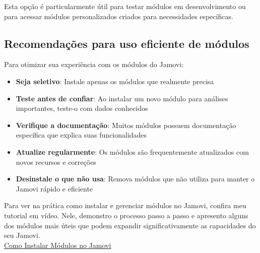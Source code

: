 Esta opção é particularmente útil para testar módulos em desenvolvimento ou para acessar módulos personalizados criados para necessidades específicas.

\subsection{Recomendações para uso eficiente de módulos}

Para otimizar sua experiência com os módulos do Jamovi:

\begin{itemize}
    \item \textbf{Seja seletivo}: Instale apenas os módulos que realmente precisa
    \item \textbf{Teste antes de confiar}: Ao instalar um novo módulo para análises importantes, teste-o com dados conhecidos
    \item \textbf{Verifique a documentação}: Muitos módulos possuem documentação específica que explica suas funcionalidades
    \item \textbf{Atualize regularmente}: Os módulos são frequentemente atualizados com novos recursos e correções
    \item \textbf{Desinstale o que não usa}: Remova módulos que não utiliza para manter o Jamovi rápido e eficiente
\end{itemize}

\begin{tcolorbox}[colback=white,colframe=green,title={\faPlayCircle \ Dica de Conteúdo}]
  Para ver na prática como instalar e gerenciar módulos no Jamovi, confira meu tutorial em vídeo. Nele, demonstro o processo passo a passo e apresento alguns dos módulos mais úteis que podem expandir significativamente as capacidades do seu Jamovi.\\
  \faYoutube{} \href{https://youtu.be/qBeRMNldzgs?si=TRYPqcPQeUFthNuo}{Como Instalar Módulos no Jamovi}
\end{tcolorbox}



